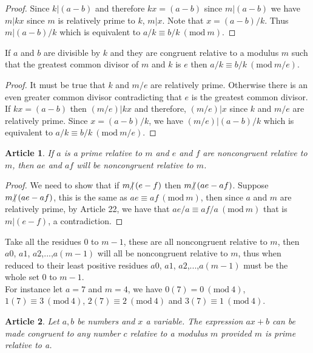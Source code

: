 \documentclass{article}
\theoremstyle{problemstyle}
\newtheorem{article}{Article}
\newcommand{\Mod}[1]{\ (\mathrm{mod}\ #1)}
\newcommand{\ndiv}{\hspace{-4pt}\not|\hspace{2pt}}
\begin{document}
\begin{proof}
Since $k|(a-b)$ and therefore $kx = (a-b)$ since $m|(a-b)$ we have $m|kx$ since $m$ is relatively prime to $k$,  $m|x$. Note that $x = (a-b)/k$. Thus $m|(a-b)/k$ which is equivalent to $a/k \equiv b/k \Mod{m}$.
\end{proof}

If $a$ and $b$ are divisible by $k$ and they are congruent relative to a modulus $m$ such that the greatest common divisor of $m$ and $k$ is $e$ then $a/k \equiv b/k \Mod{m/e}$.

\begin{proof}
It must be true that $k$ and $m/e$ are relatively prime. Otherwise there is an even greater common divisor contradicting that $e$ is the greatest common divisor. If $kx = (a-b)$ then $(m/e)|kx$ and therefore, $(m/e)|x$ since $k$ and $m/e$ are relatively prime. Since $x = (a-b)/k$, we have $(m/e)|(a-b)/k$ which is equivalent to $a/k \equiv b/k \Mod{m/e}$. 
\end{proof}

\begin{article}
If $a$ is a prime relative to $m$ and $e$ and $f$ are noncongruent relative to $m$, then $ae$ and $af$ will be noncongruent relative to $m$.    
\end{article}

\begin{proof}
We need to show that if $m\ndiv (e-f)$ then $m \ndiv (ae-af)$. Suppose $m \ndiv (ae-af)$, this is the same as $ae\equiv af \Mod{m}$, then since $a$ and $m$ are relatively prime, by Article 22, we have that $ae/a \equiv af/a \Mod{m}$ that is $m|(e-f)$, a contradiction. 
\end{proof}

Take all the residues $0$ to $m-1$, these are all noncongruent relative to $m$, then $a0$, $a1$, $a2$,...,$a(m-1)$ will all be noncongruent relative to $m$, thus when reduced to their least positive residues $a0$, $a1$, $a2$,...,$a(m-1)$ must be the whole set $0$ to $m-1$.\\ 

For instance let $a = 7$ and $m = 4$, we have  $0(7) = 0 \Mod{4}$, $1(7) \equiv 3 \Mod{4}$, $2(7) \equiv 2 \Mod{4}$ and $3(7) \equiv 1 \Mod{4}$. 

\begin{article}
Let $a,b$ be numbers and $x$ a variable. The expression $ax + b$ can be made congruent to any number $c$ relative to a modulus $m$ provided $m$ is prime relative to a. 
\end{article}
\end{document}

